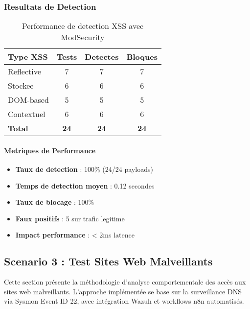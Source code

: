 \subsubsection{Resultats de Detection}

\begin{table}[H]
    \centering
    \caption{Performance de detection XSS avec ModSecurity}
    \begin{tabular}{|l|c|c|c|}
        \hline
        \textbf{Type XSS} & \textbf{Tests} & \textbf{Detectes} & \textbf{Bloques} \\
        \hline
        Reflective        & 7              & 7                 & 7                \\
        \hline
        Stockee           & 6              & 6                 & 6                \\
        \hline
        DOM-based         & 5              & 5                 & 5                \\
        \hline
        Contextuel        & 6              & 6                 & 6                \\
        \hline
        \textbf{Total}    & \textbf{24}    & \textbf{24}       & \textbf{24}      \\
        \hline
    \end{tabular}
\end{table}

\paragraph{Metriques de Performance}
\begin{itemize}
    \item \textbf{Taux de detection} : 100\% (24/24 payloads)
    \item \textbf{Temps de detection moyen} : 0.12 secondes
    \item \textbf{Taux de blocage} : 100\%
    \item \textbf{Faux positifs} : 5 sur trafic legitime
    \item \textbf{Impact performance} : < 2ms latence
\end{itemize}




\subsection{Scenario 3 : Test Sites Web Malveillants}

Cette section présente la méthodologie d'analyse comportementale des accès aux sites web malveillants. L'approche implémentée se base sur la surveillance DNS via Sysmon Event ID 22, avec intégration Wazuh et workflows n8n automatisés.

